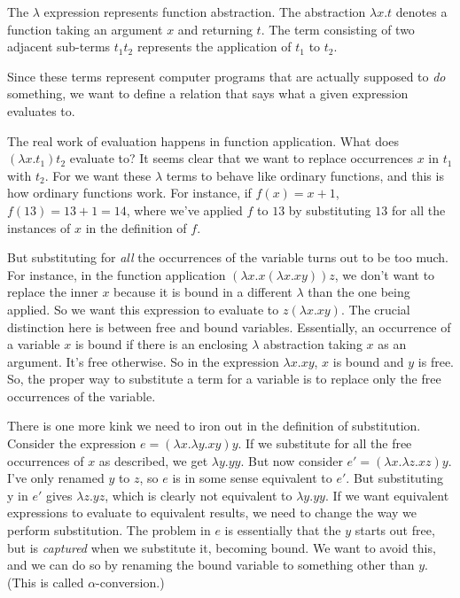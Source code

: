 \documentclass[pageno]{jpaper}
\begin{document}
{The $\lambda$ expression represents function abstraction. The abstraction $\lambda x.t$ denotes
a function taking an argument $x$ and returning $t$. The term consisting of two adjacent sub-terms $t_1 t_2$ represents the application of $t_1$ to $t_2$.

Since these terms represent computer programs that are actually supposed to \textit{do} something, we want to
define a relation that says what a given expression evaluates to.

The real work of evaluation happens in function application. What does $(\lambda x.t_1)t_2$ evaluate to?
It seems clear that we want to replace occurrences $x$ in $t_1$ with $t_2$.
For we want these $\lambda$ terms to behave like ordinary functions, and this is how ordinary functions work.
For instance, if $f(x) = x + 1$, $f(13) = 13 + 1 = 14$, where we've applied $f$ to $13$ by substituting
$13$ for all the instances of $x$ in the definition of $f$.

But substituting for \textit{all} the occurrences of the variable turns out to be too much.
For instance, in the function application $(\lambda x. x (\lambda x. x y)) z$, we don't want to replace the inner
$x$ because it is bound in a different $\lambda$ than the one being applied.
So we want this expression to evaluate to $z (\lambda x. x y)$. The crucial distinction here is between
free and bound variables. Essentially, an occurrence of a variable $x$ is bound if there is an enclosing $\lambda$ abstraction taking $x$ as an argument.  It's free otherwise. So in the expression $\lambda x. x y$,
$x$ is bound and $y$ is free.  So, the proper way to substitute a term for a variable is to replace only
the free occurrences of the variable. 

There is one more kink we need to iron out in the definition of substitution. Consider the expression
$e = (\lambda x. \lambda y. x y) y$. If we substitute for all the free occurrences of $x$ as described, we get
$\lambda y.y y$. But now consider $e' = (\lambda x. \lambda z. x z) y$. I've only renamed $y$ to $z$, so
$e$ is in some sense equivalent to $e'$. But substituting y in $e'$ gives $\lambda z.y z$, which is clearly not equivalent to $\lambda y. y y$. If we want equivalent expressions to evaluate to equivalent results, we need to
change the way we perform substitution. The problem in $e$ is essentially that the $y$ starts out free, but is
\textit{captured} when we substitute it, becoming bound.  We want to avoid this, and we can do so by
renaming the bound variable to something other than $y$. (This is called $\alpha$-conversion.)

}
\end{document}
